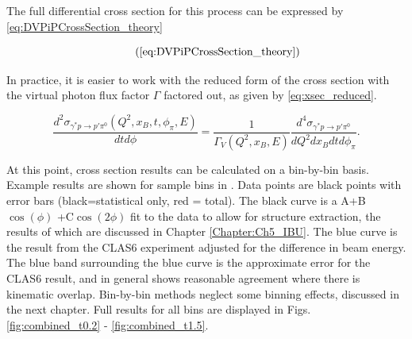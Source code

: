 The full differential cross section for this process can be expressed by \eqref{eq:DVPiPCrossSection_theory}

        \begin{equation*}
          \recallLabel{eq:DVPiPCrossSection_theory}
        \end{equation*}

In practice, it is easier to work with the reduced form of the cross section with the virtual photon flux factor $\Gamma$ factored out, as given by \eqref{eq:xsec_reduced}.

 \begin{equation}\label{eq:xsec_reduced}
    \frac{d^2\sigma_{\gamma^*p \rightarrow p'\pi^0}(Q^2,x_B,t,\phi_{\pi},E)}{dtd\phi} = \frac{1}{\Gamma_V(Q^2,x_B,E)} \frac{d^4\sigma_{\gamma^*p \rightarrow p'\pi^0}}{dQ^2dx_Bdtd\phi_{\pi}}.
\end{equation}

At this point, cross section results can be calculated on a bin-by-bin basis. Example results are shown for sample bins in . Data points are black points with error bars (black=statistical only, red = total). The black curve is a A+B$\cos(\phi)$ +C$\cos(2\phi)$ fit to the data to allow for structure extraction, the results of which are discussed in Chapter \ref{Chapter:Ch5_IBU}. The blue curve is the result from the CLAS6 experiment \parencite{Bedlinskiy2014ExclusiveCLAS} adjusted for the difference in beam energy. The blue band surrounding the blue curve is the approximate error for the CLAS6 result, and in general shows reasonable agreement where there is kinematic overlap. Bin-by-bin methods neglect some binning effects, discussed in the next chapter. Full results for all bins are displayed in Figs. \ref{fig:combined_t0.2} - \ref{fig:combined_t1.5}.

